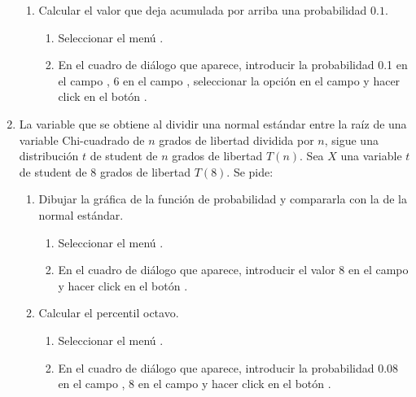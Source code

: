 \begin{enumerate}[leftmargin=*]
\begin{enumerate}
\item Calcular el valor que deja acumulada por arriba una probabilidad $0.1$.
\begin{indicacion}
\begin{enumerate}
\item Seleccionar el menú .
\item En el cuadro de diálogo que aparece, introducir la probabilidad 0.1 en el campo , 6 en el
campo , seleccionar la opción  en el campo  y hacer
click en el botón .
\end{enumerate}
\end{indicacion}
\end{enumerate}


\item La variable que se obtiene al dividir una normal estándar entre la raíz de una variable Chi-cuadrado de $n$ grados
de libertad dividida por $n$, sigue una distribución $t$ de student de $n$ grados de libertad $T(n)$. 
Sea $X$ una variable $t$ de student de 8 grados de libertad $T(8)$. Se pide:
\begin{enumerate}
\item Dibujar la gráfica de la función de probabilidad y compararla con la de la normal estándar.
\begin{indicacion}
\begin{enumerate}
\item Seleccionar el menú .
\item En el cuadro de diálogo que aparece, introducir el valor 8 en el campo  y hacer click en
el botón .
\end{enumerate}
\end{indicacion}

\item Calcular el percentil octavo. 
\begin{indicacion}
\begin{enumerate}
\item Seleccionar el menú .
\item En el cuadro de diálogo que aparece, introducir la probabilidad 0.08 en el campo , 8 en el campo  y hacer click en el botón .
\end{enumerate}
\end{indicacion}


\end{enumerate}
\end{enumerate}
